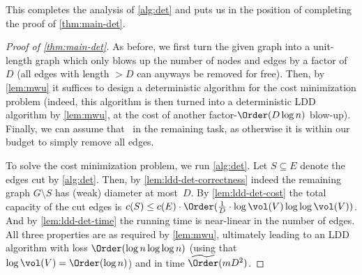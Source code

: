 This completes the analysis of \cref{alg:det} and puts us in the position of completing the proof of \cref{thm:main-det}.

\begin{proof}[Proof of \cref{thm:main-det}]
As before, we first turn the given graph into a unit-length graph which only blows up the number of nodes and edges by a factor of $D$ (all edges with length $> D$ can anyways be removed for free). Then, by \cref{lem:mwu} it suffices to design a deterministic algorithm for the cost minimization problem (indeed, this algorithm is then turned into a deterministic LDD algorithm by \cref{lem:mwu}, at the cost of another factor-$\Order(D \log n)$ blow-up). Finally, we can assume that~ in the remaining task, as otherwise it is within our budget to simply remove all edges.

To solve the cost minimization problem, we run \cref{alg:det}. Let $S \subseteq E$ denote the edges cut by \cref{alg:det}. Then, by \cref{lem:ldd-det-correctness} indeed the remaining graph $G \setminus S$ has (weak) diameter at most~$D$. By \cref{lem:ldd-det-cost} the total capacity of the cut edges is $c(S) \leq c(E) \cdot \Order(\frac{1}{D} \cdot \log\vol(V) \log\log\vol(V))$. And by \cref{lem:ldd-det-time} the running time is near-linear in the number of edges. All three properties are as required by \cref{lem:mwu}, ultimately leading to an LDD algorithm with loss $\Order(\log n \log\log n)$ (using that $\log \vol(V) = \Order(\log n)$) and in time $\widetilde\Order(m D^2)$.
\end{proof}